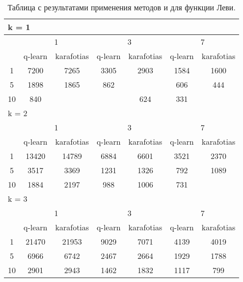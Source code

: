 \begin{table}
  \centering
  \begin{tabular}{|*7{c|}}
  \hline
  \multicolumn{7}{|l|}{k = 1} \\
  \hline
  \multirow{2}{*}{\diagbox{$\mu$}{$\lambda$}} & \multicolumn{2}{c|}{1} & \multicolumn{2}{c|}{3} & \multicolumn{2}{c|}{7} \\
  \cline{2-7}
  & q-learn & karafotias & q-learn & karafotias & q-learn & karafotias \\
  \hline
  1 & 7200 & 7265 & 3305 & 2903 & 1584 & 1600 \\
  \hline
  5 & 1898 & 1865 & 862 & \cellcolor{olive}{794} & 606 & 444 \\
  \hline
  10 & 840& \cellcolor{olive}{804} & \cellcolor{olive}{502} & 624 & 331 & \cellcolor{olive}{294} \\
  \hline
  \multicolumn{7}{|l|}{k = 2} \\
  \hline
  \multirow{2}{*}{\diagbox{$\mu$}{$\lambda$}} & \multicolumn{2}{c|}{1} & \multicolumn{2}{c|}{3} & \multicolumn{2}{c|}{7} \\
  \cline{2-7}
  & q-learn & karafotias & q-learn & karafotias & q-learn & karafotias \\
  \hline
  1 & 13420 & 14789 & 6884 & 6601 & 3521 & 2370 \\
  \hline
  5 & 3517 & 3369 & 1231 & 1326 & 792 & 1089 \\
  \hline
  10 & 1884 & 2197 & 988 & 1006 & 731& \cellcolor{olive}{564} \\
  \hline
  \multicolumn{7}{|l|}{k = 3} \\
  \hline
  \multirow{2}{*}{\diagbox{$\mu$}{$\lambda$}} & \multicolumn{2}{c|}{1} & \multicolumn{2}{c|}{3} & \multicolumn{2}{c|}{7} \\
  \cline{2-7}
  & q-learn & karafotias & q-learn & karafotias & q-learn & karafotias \\
  \hline
  1 & 21470 & 21953 & 9029 & 7071 & 4139 & 4019 \\
  \hline
  5 & 6966 & 6742& 2467 & 2664 & 1929 & 1788 \\
  \hline
  10 & 2901 & 2943 & 1462 & 1832 & 1117 & 799 \\
  \hline
  \end{tabular}
  \captionsetup{justification=centering}
  \caption{Таблица с результатами применения методов  и  для функции Леви.}
  \label{q_levi_results}
\end{table}

